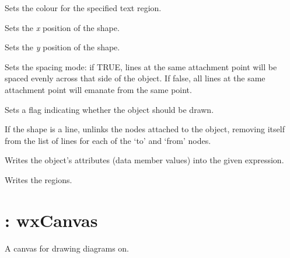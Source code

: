 Sets the colour for the specified text region.



Sets the {\it x} position of the shape.



Sets the {\it y} position of the shape.



Sets the spacing mode: if TRUE, lines at the same attachment point will be
spaced evenly across that side of the object. If false, all lines at the
same attachment point will emanate from the same point.



Sets a flag indicating whether the object should be drawn.



If the shape is a line, unlinks the nodes attached to the object, removing itself from the list of
lines for each of the `to' and `from' nodes.



Writes the object's attributes (data member values) into the given expression.



Writes the regions.



\section{: wxCanvas}\label{wxshapecanvas}

A canvas for drawing diagrams on.



